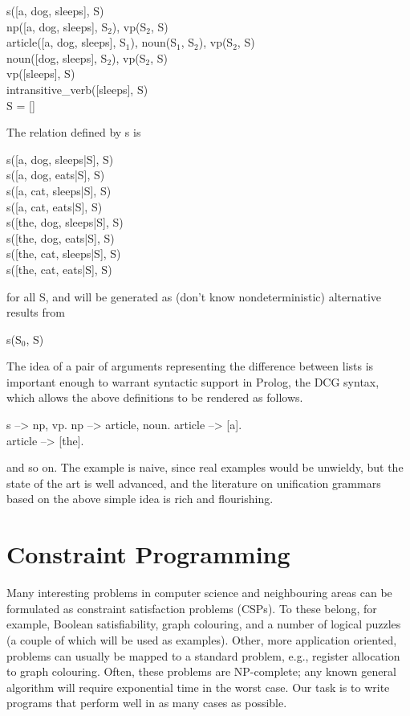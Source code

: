 %
\begin{progex}
s([a, dog, sleeps], S) \\
np([a, dog, sleeps], S$_2$), vp(S$_2$, S) \\
article([a, dog, sleeps], S$_1$), noun(S$_1$, S$_2$), vp(S$_2$, S) \\
noun([dog, sleeps], S$_2$), vp(S$_2$, S) \\
vp([sleeps], S) \\
intransitive_verb([sleeps], S) \\
S = []
\end{progex}%
%
The relation defined by {\prog s} is
%
\begin{progex}
s([a, dog, sleeps|S], S) \\
s([a, dog, eats|S], S) \\
s([a, cat, sleeps|S], S) \\
s([a, cat, eats|S], S) \\
s([the, dog, sleeps|S], S) \\
s([the, dog, eats|S], S) \\
s([the, cat, sleeps|S], S) \\
s([the, cat, eats|S], S)
\end{progex}%
%
for all {\prog S}, and will be generated as (don't know
nondeterministic) alternative results from
%
\begin{progex}
s(S$_0$, S)
\end{progex}%
%
The idea of a pair of arguments representing the difference between
lists is important enough to warrant syntactic support in Prolog, the
DCG syntax, which allows the above definitions to be rendered as
follows.
%
\begin{program}
s --> np, vp.  \nl
np --> article, noun.  \nl
article --> [a].  \\
article --> [the].
\end{program}%
%
and so on.  The example is naive, since real examples would be
unwieldy, but the state of the art is well advanced, and the
literature on unification grammars based on the above simple idea is
rich and flourishing.

\section{Constraint Programming}

Many interesting problems in computer science and neighbouring areas
can be formulated as constraint satisfaction problems (CSPs).  To
these belong, for example, Boolean satisfiability, graph colouring,
and a number of logical puzzles (a couple of which will be used as
examples).  Other, more application oriented, problems can usually be
mapped to a standard problem, e.g., register allocation to graph
colouring.  Often, these problems are NP-complete; any known general
algorithm will require exponential time in the worst case.  Our task
is to write programs that perform well in as many cases as possible.

